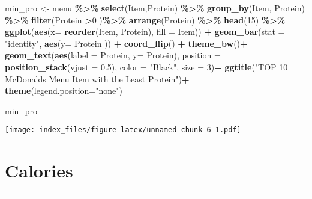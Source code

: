 \documentclass[
]{article}
\newenvironment{Shaded}{\begin{snugshade}}{\end{snugshade}}
\newcommand{\AttributeTok}[1]{\textcolor[rgb]{0.13,0.29,0.53}{#1}}
\newcommand{\DecValTok}[1]{\textcolor[rgb]{0.00,0.00,0.81}{#1}}
\newcommand{\FloatTok}[1]{\textcolor[rgb]{0.00,0.00,0.81}{#1}}
\newcommand{\FunctionTok}[1]{\textcolor[rgb]{0.13,0.29,0.53}{\textbf{#1}}}
\newcommand{\NormalTok}[1]{#1}
\newcommand{\OtherTok}[1]{\textcolor[rgb]{0.56,0.35,0.01}{#1}}
\newcommand{\SpecialCharTok}[1]{\textcolor[rgb]{0.81,0.36,0.00}{\textbf{#1}}}
\newcommand{\StringTok}[1]{\textcolor[rgb]{0.31,0.60,0.02}{#1}}
\begin{document}
\begin{Shaded}
\begin{Highlighting}[]
\NormalTok{min\_pro }\OtherTok{\textless{}{-}}\NormalTok{ menu }\SpecialCharTok{\%\textgreater{}\%} 
  \FunctionTok{select}\NormalTok{(Item,Protein) }\SpecialCharTok{\%\textgreater{}\%}  
  \FunctionTok{group\_by}\NormalTok{(Item, Protein) }\SpecialCharTok{\%\textgreater{}\%} 
  \FunctionTok{filter}\NormalTok{(Protein }\SpecialCharTok{\textgreater{}}\DecValTok{0}\NormalTok{ )}\SpecialCharTok{\%\textgreater{}\%} 
  \FunctionTok{arrange}\NormalTok{(Protein) }\SpecialCharTok{\%\textgreater{}\%} 
  \FunctionTok{head}\NormalTok{(}\DecValTok{15}\NormalTok{)  }\SpecialCharTok{\%\textgreater{}\%} 
  \FunctionTok{ggplot}\NormalTok{(}\FunctionTok{aes}\NormalTok{(}\AttributeTok{x=} \FunctionTok{reorder}\NormalTok{(Item, }
\NormalTok{                        Protein),}
             \AttributeTok{fill =}\NormalTok{ Item)) }\SpecialCharTok{+} 
  \FunctionTok{geom\_bar}\NormalTok{(}\AttributeTok{stat =} \StringTok{"identity"}\NormalTok{,}
           \FunctionTok{aes}\NormalTok{(}\AttributeTok{y=}\NormalTok{ Protein )) }\SpecialCharTok{+}
  \FunctionTok{coord\_flip}\NormalTok{() }\SpecialCharTok{+}
  \FunctionTok{theme\_bw}\NormalTok{()}\SpecialCharTok{+} 
  \FunctionTok{geom\_text}\NormalTok{(}\FunctionTok{aes}\NormalTok{(}\AttributeTok{label =}\NormalTok{ Protein, }
                \AttributeTok{y=}\NormalTok{ Protein),}
            \AttributeTok{position =} \FunctionTok{position\_stack}\NormalTok{(}\AttributeTok{vjust =} \FloatTok{0.5}\NormalTok{),}
            \AttributeTok{color =} \StringTok{"Black"}\NormalTok{,}
            \AttributeTok{size =} \DecValTok{3}\NormalTok{)}\SpecialCharTok{+}
  \FunctionTok{ggtitle}\NormalTok{(}\StringTok{"TOP 10 McDonald\textquotesingle{}s Menu Item with the Least Protein"}\NormalTok{)}\SpecialCharTok{+}
  \FunctionTok{theme}\NormalTok{(}\AttributeTok{legend.position=}\StringTok{"none"}\NormalTok{)}

\NormalTok{min\_pro}
\end{Highlighting}
\end{Shaded}

\texttt{[image: index\_files/figure-latex/unnamed-chunk-6-1.pdf]}

\hypertarget{calories}{%
\section{Calories}\label{calories}}

\begin{center}\rule{0.5\linewidth}{0.5pt}\end{center}
\end{document}
